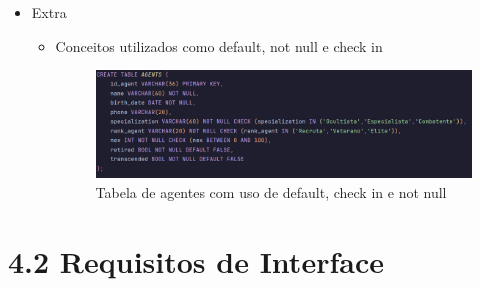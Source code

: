 \documentclass[12pt,a4paper]{report}
\begin{document}
\begin{itemize}
\begin{itemize}
        \item Extra
            \begin{itemize}
                \item Conceitos utilizados como default, not null e check in
                \begin{figure}[H]
                    \centering
                    \includegraphics[width=1\linewidth]{agents_table.png}
                    \caption{Tabela de agentes com uso de default, check in e not null}
                    \label{fig:enter-label}
                \end{figure}
            \end{itemize}
    \end{itemize}
\end{itemize}
\section{4.2 Requisitos de Interface}
\end{document}

